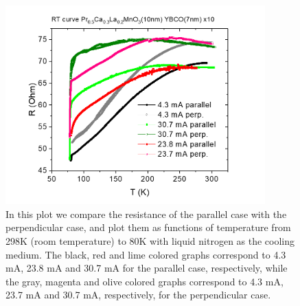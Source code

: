\documentclass{comjnl}
\begin{document}
\begin{figure}[h]
\centering
\includegraphics[width=100mm]{Bilde2.png}
\caption{In this plot we compare the resistance of the parallel case with the perpendicular case, and plot them as functions of temperature from 298K (room temperature) to 80K with liquid nitrogen as the cooling medium. The black, red and lime colored graphs correspond to 4.3 mA, 23.8 mA and 30.7 mA for the parallel case, respectively, while the gray, magenta and olive colored graphs correspond to 4.3 mA, 23.7 mA and 30.7 mA, respectively, for the perpendicular case. \label{fig:res}}
\end{figure}
\end{document}
